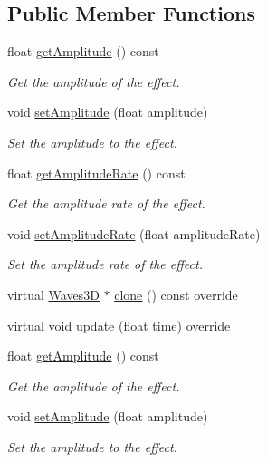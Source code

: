 \subsection*{Public Member Functions}
\begin{DoxyCompactItemize}
\item 
float \hyperlink{classWaves3D_a39b277cd8949ec1862b297d84140c75c}{get\+Amplitude} () const
\begin{DoxyCompactList}\small\item\em Get the amplitude of the effect. \end{DoxyCompactList}\item 
void \hyperlink{classWaves3D_a02f8620f2b45b47e5cb94c87f36674ac}{set\+Amplitude} (float amplitude)
\begin{DoxyCompactList}\small\item\em Set the amplitude to the effect. \end{DoxyCompactList}\item 
float \hyperlink{classWaves3D_a1695dd124fd56fe1ec1c7102d26db794}{get\+Amplitude\+Rate} () const
\begin{DoxyCompactList}\small\item\em Get the amplitude rate of the effect. \end{DoxyCompactList}\item 
void \hyperlink{classWaves3D_a9ab0956b09066554cf41f0bd38749495}{set\+Amplitude\+Rate} (float amplitude\+Rate)
\begin{DoxyCompactList}\small\item\em Set the amplitude rate of the effect. \end{DoxyCompactList}\item 
virtual \hyperlink{classWaves3D}{Waves3D} $\ast$ \hyperlink{classWaves3D_ab41b6156741e145fbd6c3626bc16ec25}{clone} () const override
\item 
virtual void \hyperlink{classWaves3D_ab57395f1108bb8a86bf722ebbab2cdd1}{update} (float time) override
\item 
float \hyperlink{classWaves3D_a39b277cd8949ec1862b297d84140c75c}{get\+Amplitude} () const
\begin{DoxyCompactList}\small\item\em Get the amplitude of the effect. \end{DoxyCompactList}\item 
void \hyperlink{classWaves3D_a02f8620f2b45b47e5cb94c87f36674ac}{set\+Amplitude} (float amplitude)
\begin{DoxyCompactList}\small\item\em Set the amplitude to the effect. \end{DoxyCompactList}\item 

\end{DoxyCompactItemize}

